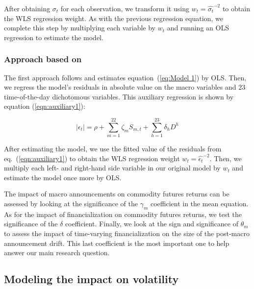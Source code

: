 After obtaining  $\sigma_t$ for each observation, we transform it using $w_t = \hat{\sigma_t}^{-2}$ to obtain the WLS regression weight.
As with the previous regression equation, we complete this step by multiplying each variable by  $w_t$ and running an OLS regression to estimate the model.    %
 

 
\subsubsection{Approach based on \citet*{andersen2007real}}

 The first approach follows \citet{andersen2007real} and estimates equation~(\ref{eq:Model 1}) by OLS. Then, we regress the model's residuals in absolute value on the macro variables and 23 time-of-the-day dichotomous variables. This auxiliary regression is shown by equation (\ref{eqn:auxiliary1}):

\begin{equation}\label{eqn:auxiliary1}
\mid \epsilon_{t} \mid=\rho+\sum_{m=1}^{22} \zeta_m S_{m,t}+\sum_{h=1}^{23} \delta_h D^h 
\end{equation}


After estimating the model, we use the fitted value of the residuals from eq.~(\ref{eqn:auxiliary1}) to obtain the WLS regression weight $w_t = \hat{\epsilon_t}^{-2}$. Then, we multiply each left- and right-hand side variable in our original model by $w_t$ and estimate the model once more by OLS.
%


 
 
The impact of macro announcements on commodity futures returns  can be assessed by looking at the significance of the $\gamma_m$ coefficient  in the mean equation. As for the impact of financialization on commodity futures returns, we test the significance of the $\delta$ coefficient. Finally, we look at the sign and significance of $\theta_m$ to assess the impact of time-varying financialization on the size of the post-macro announcement drift. This last coefficient is the most important one to help answer our main research question.
 
\subsection{Modeling the impact on volatility}\label{variance}

